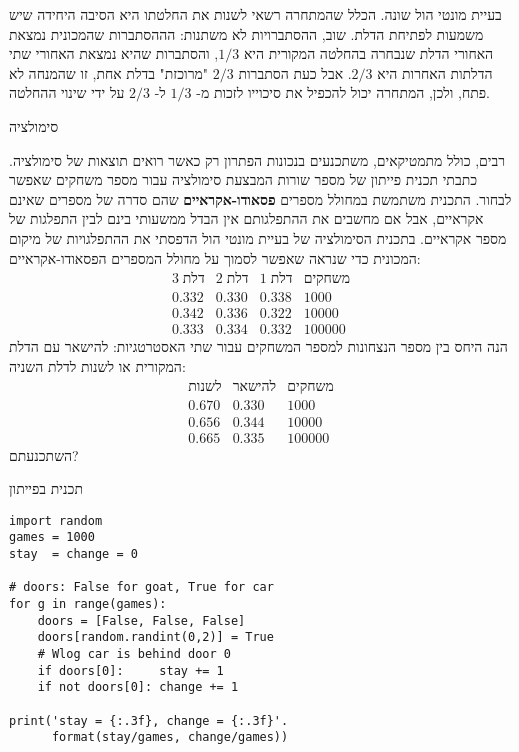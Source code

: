 \documentclass[12pt,a4paper,leqno]{article}
\begin{document}
בעיית מונטי הול שונה. הכלל שהמתחרה רשאי לשנות את החלטתו היא הסיבה היחידה שיש משמעות לפתיחת הדלת. שוב, ההסתברויות לא משתנות: הההסתברות שהמכונית נמצאת האחורי הדלת שנבחרה בהחלטה המקורית היא
$1/3$,
והסתברות שהיא נמצאת האחורי שתי הדלתות האחרות היא
$2/3$.
אבל כעת הסתברות
$2/3$
"מרוכזת" בדלת אחת, זו שהמנחה לא פתח, ולכן, המתחרה יכול להכפיל את סיכוייו לזכות מ-%
$1/3$
ל-%
$2/3$
על ידי שינוי ההחלטה.

{\bigskip\Large
סימולציה}

רבים, כולל מתמטיקאים, משתכנעים בנכונות הפתרון רק כאשר רואים  תוצאות של סימולציה. כתבתי תכנית פייתון של מספר שורות המבצעת סימולציה עבור מספר משחקים שאפשר לבחור. התכנית משתמשת במחולל מספרים 
\textbf{פסאודו-אקראיים}
שהם סדרה של מספרים שאינם אקראיים, אבל אם מחשבים את ההתפלגותם אין הבדל ממשעותי בינם לבין התפלגות של מספר אקראיים. בתכנית הסימולציה של בעיית מונטי הול הדפסתי את ההתפלגויות של מיקום המכונית כדי שנראה שאפשר לסמוך על מחולל המספרים הפסאודו-אקראיים:
\[
\begin{array}{r|r|r|r}
3\;\textrm{דלת}&
2\;\textrm{דלת}&
1\;\textrm{דלת}&
\textrm{משחקים}
\\\hline
0.332 & 0.330 & 0.338 & 1000\\
0.342 & 0.336 & 0.322 & 10000\\
0.333 & 0.334 & 0.332 & 100000
\end{array}
\]
הנה היחס בין מספר הנצחונות למספר המשחקים עבור שתי האסטרטגיות: להישאר עם הדלת המקורית או לשנות לדלת השניה:
\[
\begin{array}{r|r|r}
\textrm{לשנות} &
\textrm{להישאר} &
\textrm{משחקים}
\\\hline
0.670 & 0.330 & 1000\\
0.656 & 0.344 & 10000\\
0.665 & 0.335 & 100000
\end{array}
\]
השתכנעתם?

{\bigskip\Large
תכנית בפייתון}

\begin{verbatim}
import random
games = 1000
stay  = change = 0

# doors: False for goat, True for car
for g in range(games):
    doors = [False, False, False]
    doors[random.randint(0,2)] = True
    # Wlog car is behind door 0
    if doors[0]:     stay += 1
    if not doors[0]: change += 1

print('stay = {:.3f}, change = {:.3f}'.
      format(stay/games, change/games))
\end{verbatim}
\end{document}
